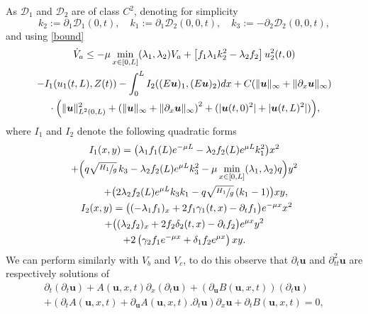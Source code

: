 \documentclass[11pt]{article}
\numberwithin{equation}{section}
\let\mathcal\mathscr
\theoremstyle{definition}
\begin{document}
As $\mathcal{D}_{1}$ and $\mathcal{D}_{2}$ are of class $C^{2}$,
denoting for simplicity
\[
k_{2}:=\partial_{1} \mathcal{D}_{1}(0,t),\quad k_{1}:=\partial_{1}\mathcal{D}_{2}(0,0,t),\quad
k_{3}:=-\partial_{2}\mathcal{D}_{2}(0,0,t),
\]
and using \eqref{bound}
\begin{multline*}
\dot V_{a}\leq
-\mu\min\limits_{x\in[0,L]}(\lambda_{1},\lambda_{2})V_{a}+\left[f_{1}\lambda_{1}k_{2}^{2}-\lambda_{2}f_{2}\right]u_{2}^{2}(t,0)\\
-I_{1}(u_{1}(t,L),Z(t))
-\int_{0}^{L}I_{2}((E\boldsymbol{u})_{1},(E\boldsymbol{u})_{2})dx+C(\lVert \boldsymbol{u}\rVert_{\infty}+\lVert \partial_{x} \boldsymbol{u}\rVert_{\infty})\\{}\cdot\Bigl(\lVert\boldsymbol{u} \rVert_{L^{2}(0,L)}^{2}+\left(\lVert \boldsymbol{u}\rVert_{\infty}+\lVert \partial_{x} \boldsymbol{u}\rVert_{\infty}\right)^{2}+(|\boldsymbol{u}(t,0)^{2}|+|\boldsymbol{u}(t,L)^{2}|)\Bigr),
\end{multline*}
where $I_{1}$ and $I_{2}$ denote the following quadratic forms
\begin{multline*}
I_{1}(x,y)=\bigl(\lambda_{1}f_{1}(L)e^{-\mu L}-\lambda_{2}f_{2}(L)e^{\mu L}k_{1}^{2}\bigr)x^{2}\\
+{\Bigl(q\sqrt{\sfrac{H_{1}}{g}}\,k_{3}-\lambda_{2}f_{2}(L)e^{\mu L}k_{3}^{2}-\mu\min\limits_{x\in[0,L]}(\lambda_{1},\lambda_{2})q\Bigr)}y^{2}\\
\shoveright{+\bigl(2\lambda_{2}f_{2}(L)e^{\mu L}k_{3}k_{1}-{q\sqrt{\sfrac{H_{1}}{g}}}\,(k_{1}-1)\bigr)xy,}\\
\shoveleft{I_{2}(x,y)=\bigl((-\lambda_{1}f_{1})_{x}+2f_{1}\gamma_{1}(t,x)-\partial_{t}f_{1}\bigr)e^{-\mu x}x^{2}}\\
+\bigl((\lambda_{2}f_{2})_{x}+2f_{2}\delta_{2}(t,x)-\partial_{t}f_{2}\bigr)e^{\mu x}y^{2}\\
+2\left(\gamma_{2}f_{1}e^{-\mu x}+\delta_{1}f_{2}e^{\mu x}\right)xy.
\end{multline*}
We can perform similarly with $V_{b}$ and $V_{c}$, to do this observe that $\partial_{t}\boldsymbol{u}$ and $\partial_{tt}^{2}\boldsymbol{u}$ are respectively solutions of
\begin{multline}
\label{V2}
\partial_{t}(\partial_{t}\boldsymbol{u})+A(\boldsymbol{u},x,t)\partial_{x}(\partial_{t}\boldsymbol{u})+(\partial_{\boldsymbol{u}}B(\boldsymbol{u},x,t))(\partial_{t}\boldsymbol{u})
\\
+(\partial_{t}A(\boldsymbol{u},x,t)+\partial_{\boldsymbol{u}}A(\boldsymbol{u},x,t).\partial_{t}\boldsymbol{u})\partial_{x}\boldsymbol{u}
+\partial_{t}B\left(\boldsymbol{u},x,t\right)=0,
\end{multline}
\end{document}
